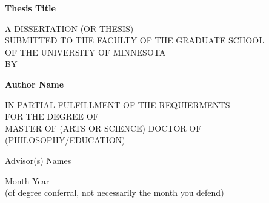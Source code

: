 %
%
%
% 

\begin{center}
     \vspace*{1cm}
         
     \Huge
     \textbf{Thesis Title}
         
     \vspace{1.5cm}
     \vfill
     \large
     A DISSERTATION (OR THESIS)\\
     SUBMITTED TO THE FACULTY OF THE GRADUATE SCHOOL\\
     OF THE UNIVERSITY OF MINNESOTA\\
     BY
         
     \textbf{Author Name}
     
     \vfill
     
     IN PARTIAL FULFILLMENT OF THE REQUIERMENTS\\
     FOR THE DEGREE OF\\
     MASTER OF (ARTS OR SCIENCE) DOCTOR OF (PHILOSOPHY/EDUCATION)
         
     \vfill
         
     \vspace{0.8cm}
         
     \Large
     Advisor(s) Names 
     
     \vspace{0.8cm}
     
     Month Year\\ 
     (of degree conferral, not necessarily the month you defend) 
 \end{center}

 
 